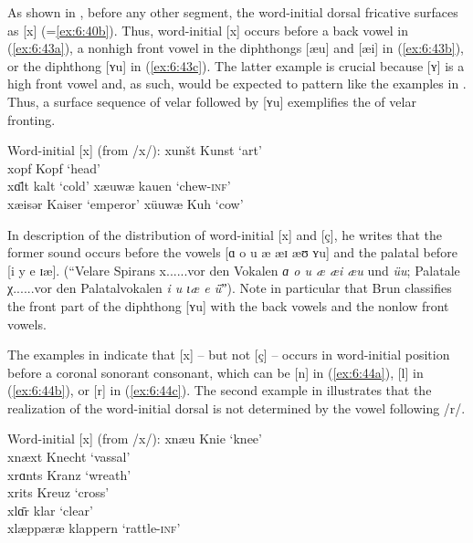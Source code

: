 As shown in , before any other segment, the word-initial dorsal fricative surfaces as [x] (=\ref{ex:6:40b}). Thus, word-initial [x] occurs before a back vowel in (\ref{ex:6:43a}), a nonhigh front vowel in the diphthongs [æu] and [æi] in (\ref{ex:6:43b}), or the diphthong [ʏu] in (\ref{ex:6:43c}). The latter example is crucial because [ʏ] is a high front vowel and, as such, would be expected to pattern like the examples in . Thus, a surface sequence of velar followed by [ʏu] exemplifies the  of velar fronting.

\ea%
\label{ex:6:43}Word-initial [x] (from /x/):
\ea\label{ex:6:43a}  xunšt  \tab [xunʃt]  \tab Kunst   \tab ‘art’  \\
     xopf   \tab [xopf]   \tab Kopf    \tab ‘head’ \\
     xɑ̄lt   \tab [xɑːlt]  \tab kalt    \tab ‘cold’ 
\ex\label{ex:6:43b}  xæuwæ  \tab [xæʊwæ]  \tab kauen   \tab ‘chew-\textsc{inf}’ \\
     xæisər \tab [xæɪsər] \tab  Kaiser \tab ‘emperor’           
\ex\label{ex:6:43c}  xüuwæ  \tab [xʏuwæ]  \tab Kuh     \tab ‘cow’               
\z 
\z 


In  description of the distribution of word-initial [x] and [ç], he writes that the former sound occurs before the vowels [ɑ o u æ æɪ æʊ ʏu] and the palatal before [i y e ɪæ]. (“Velare Spirans x......vor den Vokalen \textit{ɑ o u æ æi æu} und \textit{üu}; Palatale χ......vor den Palatalvokalen \textit{i u ɩæ e ǖ}ˮ). Note in particular that Brun classifies the front part of the diphthong [ʏu] with the back vowels and the nonlow front vowels.

The examples in  indicate that [x] -- but not [ç] -- occurs in word-initial position before a coronal sonorant consonant, which can be [n] in (\ref{ex:6:44a}), [l] in (\ref{ex:6:44b}), or [r] in (\ref{ex:6:44c}). The second example in  illustrates that the realization of the word-initial dorsal is not determined by the vowel following /r/.


\ea%
\label{ex:6:44}Word-initial [x] (from /x/):
\ea\label{ex:6:44a}  xnæu     \tab [xnæu]     \tab  Knie      \tab ‘knee’                \\
     xnæxt    \tab [xnæxt]    \tab  Knecht    \tab ‘vassal’               \\
\ex\label{ex:6:44b}  xrɑnts   \tab [xrɑnts]   \tab  Kranz     \tab ‘wreath’              \\
     xrits    \tab [xrits]    \tab  Kreuz     \tab ‘cross’               \\
\ex\label{ex:6:44c}  xlɑ̄r     \tab [xlɑːr]    \tab  klar      \tab ‘clear’               \\
     xlæppæræ \tab [xlæppæræ] \tab  klappern  \tab ‘rattle-\textsc{inf}’ \\
\z 
\z 


